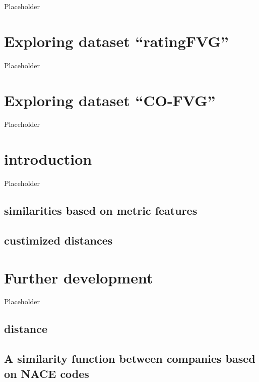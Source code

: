 \documentclass[
]{scrbook}
\begin{document}
Placeholder

\hypertarget{exploring-dataset-ratingfvg}{%
\chapter*{Exploring dataset ``ratingFVG''}\label{exploring-dataset-ratingfvg}}

Placeholder

\hypertarget{exploring-dataset-co-fvg}{%
\chapter*{Exploring dataset ``CO-FVG''}\label{exploring-dataset-co-fvg}}

Placeholder

\hypertarget{introduction}{%
\chapter*{introduction}\label{introduction}}

Placeholder

\hypertarget{similarities-based-on-metric-features}{%
\section*{similarities based on metric features}\label{similarities-based-on-metric-features}}

\hypertarget{custimized-distances}{%
\section*{custimized distances}\label{custimized-distances}}

\hypertarget{further-development}{%
\chapter*{Further development}\label{further-development}}

Placeholder

\hypertarget{distance}{%
\section{distance}\label{distance}}

\hypertarget{a-similarity-function-between-companies-based-on-nace-codes}{%
\section{A similarity function between companies based on NACE codes}\label{a-similarity-function-between-companies-based-on-nace-codes}}
\end{document}

